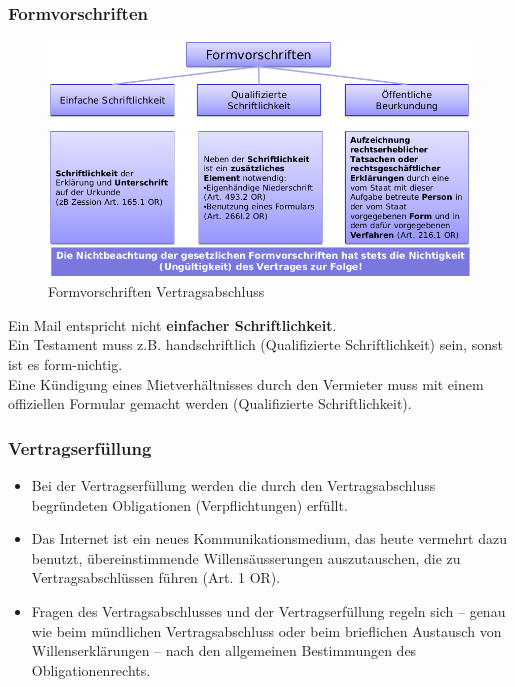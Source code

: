 \hypertarget{formvorschriften}{%
\subsubsection{Formvorschriften}\label{formvorschriften}}

\begin{figure}
\centering
\includegraphics{figures/formvorschriftenVertragsabschluss.png}
\caption{Formvorschriften Vertragsabschluss}
\end{figure}

Ein Mail entspricht nicht \textbf{einfacher Schriftlichkeit}.\\
Ein Testament muss z.B. handschriftlich (Qualifizierte Schriftlichkeit)
sein, sonst ist es form-nichtig.\\
Eine Kündigung eines Mietverhältnisses durch den Vermieter muss mit
einem offiziellen Formular gemacht werden (Qualifizierte
Schriftlichkeit).

\hypertarget{vertragserfuxfcllung}{%
\subsubsection{Vertragserfüllung}\label{vertragserfuxfcllung}}

\begin{itemize}
\tightlist
\item
  Bei der Vertragserfüllung werden die durch den Vertragsabschluss
  begründeten Obligationen (Verpflichtungen) erfüllt.
\item
  Das Internet ist ein neues Kommunikationsmedium, das heute vermehrt
  dazu benutzt, übereinstimmende Willensäusserungen auszutauschen, die
  zu Vertragsabschlüssen führen (Art. 1 OR).
\item
  Fragen des Vertragsabschlusses und der Vertragserfüllung regeln sich
  -- genau wie beim mündlichen Vertragsabschluss oder beim brieflichen
  Austausch von Willenserklärungen -- nach den allgemeinen Bestimmungen
  des Obligationenrechts.
\end{itemize}

